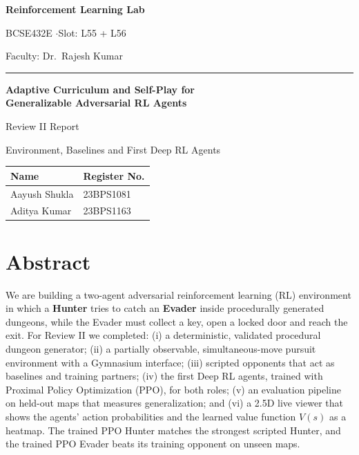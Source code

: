 \documentclass[11pt,a4paper]{article}
\begin{document}
\begin{titlepage}
\centering
\vspace*{0.5cm}
{\Large\bfseries Reinforcement Learning Lab\par}
\vspace{0.2cm}
{\large BCSE432E \quad$\cdot$\quad Slot: L55 + L56\par}
\vspace{0.2cm}
{\large Faculty: Dr.\ Rajesh Kumar\par}
\vspace{0.5cm}
\rule{\textwidth}{0.4pt}
\vspace{2cm}

{\LARGE\bfseries Adaptive Curriculum and Self-Play for\\[4pt] Generalizable Adversarial RL Agents\par}
\vspace{1cm}
{\Large Review II Report\par}
\vspace{0.4cm}
{\large Environment, Baselines and First Deep RL Agents\par}
\vspace{2cm}
\begin{tabular}{ll}
\toprule
\textbf{Name} & \textbf{Register No.}\\
\midrule
Aayush Shukla & 23BPS1081\\
Aditya Kumar & 23BPS1163\\
\bottomrule
\end{tabular}
\vfill
\end{titlepage}

\tableofcontents
\newpage

\section{Abstract}
We are building a two-agent adversarial reinforcement learning (RL) environment in which a
\textbf{Hunter} tries to catch an \textbf{Evader} inside procedurally generated dungeons, while the
Evader must collect a key, open a locked door and reach the exit. For Review II we completed:
(i) a deterministic, validated procedural dungeon generator; (ii) a partially observable,
simultaneous-move pursuit environment with a Gymnasium interface; (iii) scripted opponents that act
as baselines and training partners; (iv) the first Deep RL agents, trained with Proximal Policy
Optimization (PPO), for both roles; (v) an evaluation pipeline on held-out maps that measures
generalization; and (vi) a 2.5D live viewer that shows the agents' action probabilities and the
learned value function $V(s)$ as a heatmap. The trained PPO Hunter matches the strongest scripted
Hunter, and the trained PPO Evader beats its training opponent on unseen maps.
\end{document}
